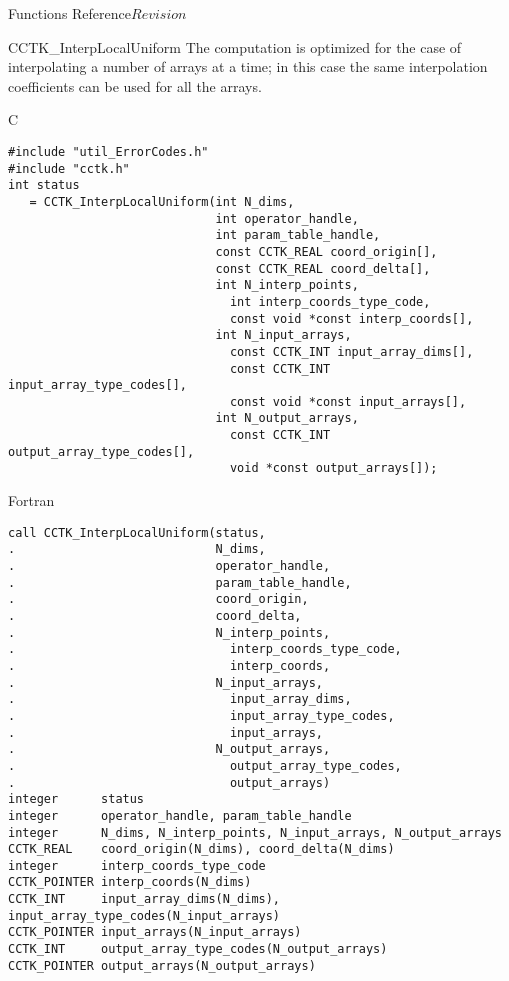 \begin{cactuspart}{ Functions Reference}{}{$Revision$}
\begin{FunctionDescription}{CCTK\_InterpLocalUniform}
The computation is optimized for the case of interpolating a
number of arrays at a time; in this case the same interpolation
coefficients can be used for all the arrays.

\begin{SynopsisSection}
\begin{Synopsis}{C}
\begin{verbatim}
#include "util_ErrorCodes.h"
#include "cctk.h"
int status
   = CCTK_InterpLocalUniform(int N_dims,
                             int operator_handle,
                             int param_table_handle,
                             const CCTK_REAL coord_origin[],
                             const CCTK_REAL coord_delta[],
                             int N_interp_points,
                               int interp_coords_type_code,
                               const void *const interp_coords[],
                             int N_input_arrays,
                               const CCTK_INT input_array_dims[],
                               const CCTK_INT input_array_type_codes[],
                               const void *const input_arrays[],
                             int N_output_arrays,
                               const CCTK_INT output_array_type_codes[],
                               void *const output_arrays[]);
\end{verbatim}
\end{Synopsis}
\begin{Synopsis}{Fortran}
\begin{verbatim}
call CCTK_InterpLocalUniform(status,
.                            N_dims,
.                            operator_handle,
.                            param_table_handle,
.                            coord_origin,
.                            coord_delta,
.                            N_interp_points,
.                              interp_coords_type_code,
.                              interp_coords,
.                            N_input_arrays,
.                              input_array_dims,
.                              input_array_type_codes,
.                              input_arrays,
.                            N_output_arrays,
.                              output_array_type_codes,
.                              output_arrays)
integer      status
integer      operator_handle, param_table_handle
integer      N_dims, N_interp_points, N_input_arrays, N_output_arrays
CCTK_REAL    coord_origin(N_dims), coord_delta(N_dims)
integer      interp_coords_type_code
CCTK_POINTER interp_coords(N_dims)
CCTK_INT     input_array_dims(N_dims), input_array_type_codes(N_input_arrays)
CCTK_POINTER input_arrays(N_input_arrays)
CCTK_INT     output_array_type_codes(N_output_arrays)
CCTK_POINTER output_arrays(N_output_arrays)
\end{verbatim}
\end{Synopsis}
\end{SynopsisSection}


\end{FunctionDescription}
\end{cactuspart}

